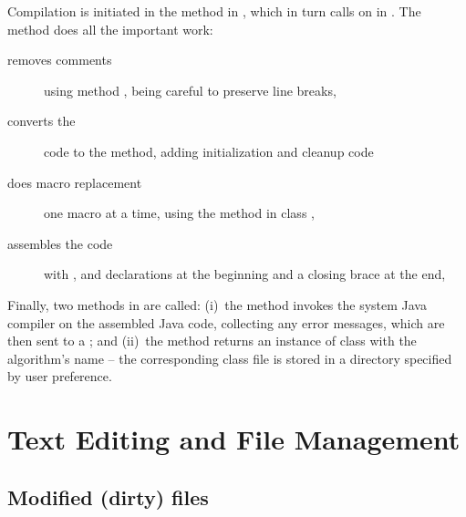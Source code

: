 Compilation is initiated in the  method in
, which in turn calls on  in
.
The method  does all the important work:
\begin{description}
\item[removes comments] using method , being careful
  to preserve line breaks,
\item[converts the ] code to the 
  method, adding initialization and cleanup code
\item[does macro replacement] one macro at a time, using the 
  method in class ,
\item[assembles the code] with ,  and 
  declarations at the beginning and a closing brace at the end,
\end{description}
Finally, two methods in  are called: (i)~the
 method invokes the system Java compiler on
the assembled Java code, collecting any error messages, which are then sent
to a ; and (ii)~the  method
returns an instance of class  with the algorithm's name --
the corresponding class file is stored in a directory specified by user
preference.



\section{Text Editing and File Management} \label{sec:editing}

\subsection{Modified (dirty) files}


